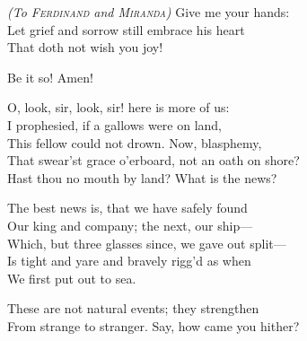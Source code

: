 \begin{verse_speech}[Alonso] 
\textit{(To \textsc{Ferdinand} and \textsc{Miranda})} Give me your hands:\\
Let grief and sorrow still embrace his heart\\
That doth not wish you joy!
\end{verse_speech}

\begin{verse_speech}[Gonzalo]
Be it so! Amen!
	
	
O, look, sir, look, sir! here is more of us:\\
I prophesied, if a gallows were on land,\\
This fellow could not drown. Now, blasphemy,\\
That swear'st grace o'erboard, not an oath on shore?\\
Hast thou no mouth by land? What is the news?
\end{verse_speech}

\begin{verse_speech}[Boatswain] 
The best news is, that we have safely found\\
Our king and company; the next, our ship—\\
Which, but three glasses since, we gave out split—\\
Is tight and yare and bravely rigg'd as when\\
We first put out to sea.
\end{verse_speech}

\begin{verse_speech}[Ariel]
\end{verse_speech}


\begin{verse_speech}[Alonso] 
These are not natural events; they strengthen\\
From strange to stranger. Say, how came you hither?
\end{verse_speech}

